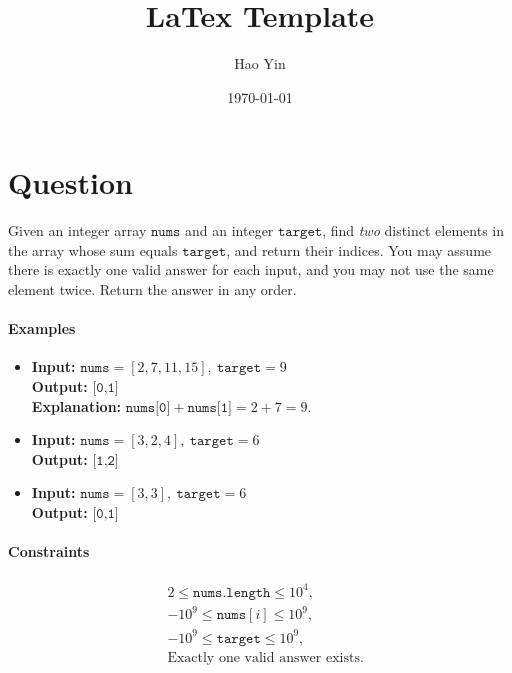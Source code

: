 \documentclass[12pt]{article}
\begin{document}
\title{LaTex Template}
\author{Hao Yin}
\date{\today}
\maketitle

\section*{Question}
    Given an integer array \(\texttt{nums}\) and an integer \(\texttt{target}\), 
        find \emph{two} distinct elements in the array whose sum equals 
        \(\texttt{target}\), and return their indices.
    You may assume there is exactly one valid answer for each input, and you may not
        use the same element twice.  
        Return the answer in any order.

    \paragraph{Examples}
    \begin{itemize}
    \item \textbf{Input:} \(\texttt{nums} = [2,7,11,15],\ \texttt{target} = 9\) \\
            \textbf{Output:} \(\texttt{[0,1]}\) \\
            \textbf{Explanation:} \(\texttt{nums[0]} + \texttt{nums[1]} = 2 + 7 = 9\).
    \item \textbf{Input:} \(\texttt{nums} = [3,2,4],\ \texttt{target} = 6\) \\
            \textbf{Output:} \(\texttt{[1,2]}\)
    \item \textbf{Input:} \(\texttt{nums} = [3,3],\ \texttt{target} = 6\) \\
            \textbf{Output:} \(\texttt{[0,1]}\)
    \end{itemize}

    \paragraph{Constraints}
    \[
    \begin{aligned}
    &2 \le \texttt{nums.length} \le 10^{4},\\
    &-10^{9} \le \texttt{nums}[i] \le 10^{9},\\
    &-10^{9} \le \texttt{target} \le 10^{9},\\
    &\text{Exactly one valid answer exists.}
    \end{aligned}
    \]
\end{document}
